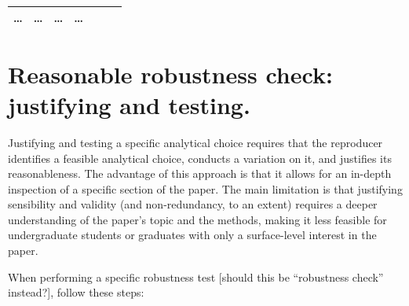 \documentclass[]{book}
\begin{document}
\begin{longtable}[]{@{}lllllll@{}}
\begin{minipage}[t]{0.12\columnwidth}
\ldots{}\strut
\end{minipage} & \begin{minipage}[t]{0.19\columnwidth}\raggedright
\ldots{}\strut
\end{minipage} & \begin{minipage}[t]{0.18\columnwidth}\raggedright
\ldots{}\strut
\end{minipage} & \begin{minipage}[t]{0.12\columnwidth}\raggedright
\ldots{}\strut
\end{minipage}\tabularnewline
\bottomrule
\end{longtable}

\hypertarget{reasonable-robustness-check-justifying-and-testing.}{%
\section{Reasonable robustness check: justifying and testing.}\label{reasonable-robustness-check-justifying-and-testing.}}

Justifying and testing a specific analytical choice requires that the reproducer identifies a feasible analytical choice, conducts a variation on it, and justifies its reasonableness. The advantage of this approach is that it allows for an in-depth inspection of a specific section of the paper. The main limitation is that justifying sensibility and validity (and non-redundancy, to an extent) requires a deeper understanding of the paper's topic and the methods, making it less feasible for undergraduate students or graduates with only a surface-level interest in the paper.

When performing a specific robustness test {[}should this be ``robustness check'' instead?{]}, follow these steps:
\end{document}
